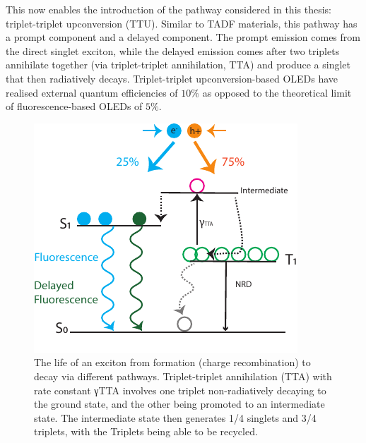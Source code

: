 \documentclass[
  letterpaper,
  DIV=11,
  numbers=noendperiod,
  oneside]{scrreprt}
\begin{document}
This now enables the introduction of the pathway considered in this
thesis: triplet-triplet upconversion (TTU). Similar to TADF materials,
this pathway has a prompt component and a delayed component. The prompt
emission comes from the direct singlet exciton, while the delayed
emission comes after two triplets annihilate together (via
triplet-triplet annihilation, TTA) and produce a singlet that then
radiatively decays. Triplet-triplet upconversion-based OLEDs have
realised external quantum efficiencies of \(10\%\) as opposed to the
theoretical limit of fluorescence-based OLEDs of \(5\%\).

\begin{figure}

{\centering \includegraphics{./images/TTUTTA.pdf}

}

\caption{\label{fig-TTUTTA}The life of an exciton from formation (charge
recombination) to decay via different pathways. Triplet-triplet
annihilation (TTA) with rate constant {γTTA} involves one triplet
non-radiatively decaying to the ground state, and the other being
promoted to an intermediate state. The intermediate state then generates
1/4 singlets and 3/4 triplets, with the Triplets being able to be
recycled.}

\end{figure}
\end{document}
